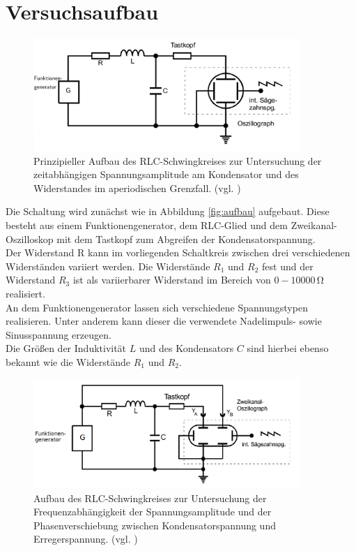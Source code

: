 \section{Versuchsaufbau}
\label{sec:Versuchsaufbau}
\begin{figure}
	\centering
	\includegraphics[width=0.9\textwidth]{Bilder/aufbaau.png}
	\caption{Prinzipieller Aufbau des RLC-Schwingkreises zur Untersuchung der zeitabhängigen Spannungsamplitude am Kondensator und des Widerstandes im aperiodischen Grenzfall. (vgl. \cite{Anleitung})}
	\label{fig:aufbau}
\end{figure}
Die Schaltung wird zunächst wie in Abbildung \eqref{fig:aufbau} aufgebaut. Diese besteht aus einem Funktionengenerator, dem RLC-Glied und dem Zweikanal-Oszilloskop mit dem Tastkopf zum Abgreifen der Kondensatorspannung.\\
Der Widerstand R kann im vorliegenden Schaltkreis zwischen drei verschiedenen Widerständen variiert werden. Die Widerstände $R_\text{1}$ und $R_\text{2}$ fest und der Widerstand $R_\text{3}$ ist als variierbarer Widerstand im Bereich von $0-10000\,\si{\ohm}$ realisiert.\\
An dem Funktionengenerator lassen sich verschiedene Spannungstypen realisieren. Unter anderem kann dieser die verwendete Nadelimpuls- sowie Sinusspannung erzeugen.\\
Die Größen der Induktivität $L$ und des Kondensators $C$ sind hierbei ebenso bekannt wie die Widerstände $R_\text{1}$ und $R_\text{2}$.

\begin{figure}
	\centering
	\includegraphics[width=0.9\textwidth]{Bilder/aufbauu.png}
	\caption{Aufbau des RLC-Schwingkreises zur Untersuchung der Frequenzabhängigkeit der Spannungsamplitude und der Phasenverschiebung zwischen Kondensatorspannung und Erregerspannung. (vgl. \cite{Anleitung})}
	\label{fig:aufbau2}
\end{figure}

